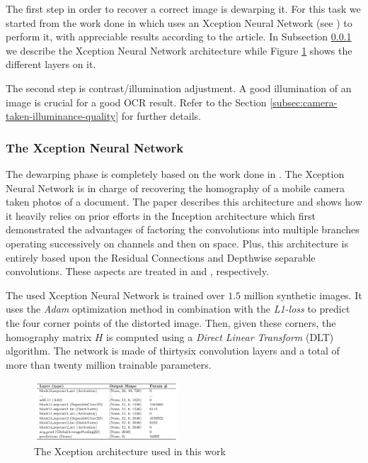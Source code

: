 \documentclass[10pt,twocolumn,letterpaper]{article}
\begin{document}
The first step in order to recover a correct image is dewarping it. For this
task we started from the work done in \cite{Korber18} which uses an
Xception Neural Network (see \cite{Xception}) to perform it,
with appreciable results according to the article. In Subsection
\ref{subsec:xception-nn-architecture} we describe the Xception Neural
Network architecture while Figure \ref{fig:xception-architecture} shows the different layers on it.

The second step is contrast/illumination adjustment. A good
illumination of an image is crucial for a good OCR result. Refer to
the Section \ref{subsec:camera-taken-illuminance-quality} for further
details.

\subsubsection{The Xception Neural Network}
\label{subsec:xception-nn-architecture}

The dewarping phase is completely based on the work done in
\cite{Korber18}. The Xception Neural Network is in charge of recovering the homography of a mobile camera taken photos of a document. The paper \cite{Xception} describes this
architecture and shows how it heavily relies on prior efforts in the
Inception architecture which first demonstrated the advantages of
factoring the convolutions into multiple branches operating
successively on channels and then on space. Plus, this architecture is
entirely based upon the Residual Connections and Depthwise separable
convolutions. These aspects are treated in \cite{Sahoo17} and
\cite{Wang18}, respectively.

The used Xception Neural Network is trained over $1.5$ million
synthetic images. It uses the \emph{Adam} optimization method in
combination with the \emph{L1-loss} to predict the four corner points
of the distorted image. Then, given these corners, the homography
matrix $H$ is computed using a \emph{Direct Linear Transform} (DLT)
algorithm. The network is made of thirtysix convolution layers and a
total of more than twenty million trainable parameters.

\begin{figure}[!ht]
  \centering
  \includegraphics[width=0.48\textwidth]{images/xception-architecture.png}
  \caption{The Xception architecture used in this work}
  \label{fig:xception-architecture}
\end{figure}
\end{document}
